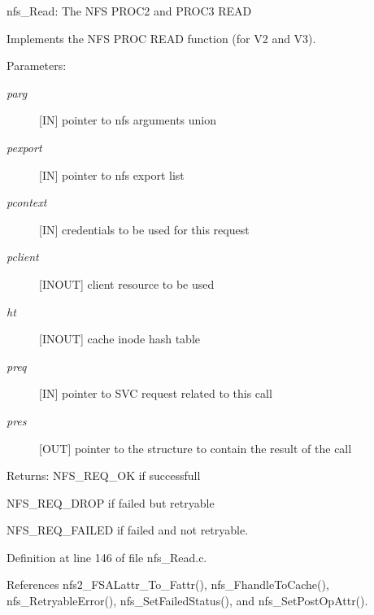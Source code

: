 nfs\_\-Read: The NFS PROC2 and PROC3 READ

Implements the NFS PROC READ function (for V2 and V3).

\begin{Desc}
\item[Parameters:]
\begin{description}
\item[{\em parg}][IN] pointer to nfs arguments union \item[{\em pexport}][IN] pointer to nfs export list \item[{\em pcontext}][IN] credentials to be used for this request \item[{\em pclient}][INOUT] client resource to be used \item[{\em ht}][INOUT] cache inode hash table \item[{\em preq}][IN] pointer to SVC request related to this call \item[{\em pres}][OUT] pointer to the structure to contain the result of the call\end{description}
\end{Desc}
\begin{Desc}
\item[Returns:]NFS\_\-REQ\_\-OK if successfull \par
 NFS\_\-REQ\_\-DROP if failed but retryable \par
 NFS\_\-REQ\_\-FAILED if failed and not retryable. \end{Desc}


Definition at line 146 of file nfs\_\-Read.c.

References nfs2\_\-FSALattr\_\-To\_\-Fattr(), nfs\_\-Fhandle\-To\-Cache(), nfs\_\-Retryable\-Error(), nfs\_\-Set\-Failed\-Status(), and nfs\_\-Set\-Post\-Op\-Attr().